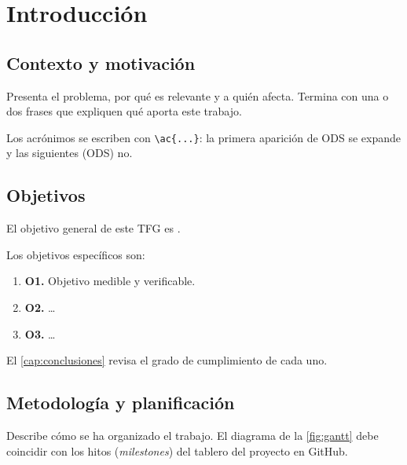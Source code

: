 \chapter{Introducción}\label{cap:introduccion}

\section{Contexto y motivación}\label{sec:motivacion}

Presenta el problema, por qué es relevante y a quién afecta. Termina con
una o dos frases que expliquen qué aporta este trabajo.

Los acrónimos se escriben con \verb|\ac{...}|: la primera aparición de
\ac{ODS} se expande y las siguientes (\ac{ODS}) no.

\section{Objetivos}\label{sec:objetivos}

El objetivo general de este \ac{TFG} es .

Los objetivos específicos son:
\begin{enumerate}
  \item \textbf{O1.} Objetivo medible y verificable.
  \item \textbf{O2.} \ldots
  \item \textbf{O3.} \ldots
\end{enumerate}
El \cref{cap:conclusiones} revisa el grado de cumplimiento de cada uno.

\section{Metodología y planificación}\label{sec:planificacion}

Describe cómo se ha organizado el trabajo. El diagrama de la
\cref{fig:gantt} debe coincidir con los hitos (\textit{milestones}) del
tablero del proyecto en GitHub.


